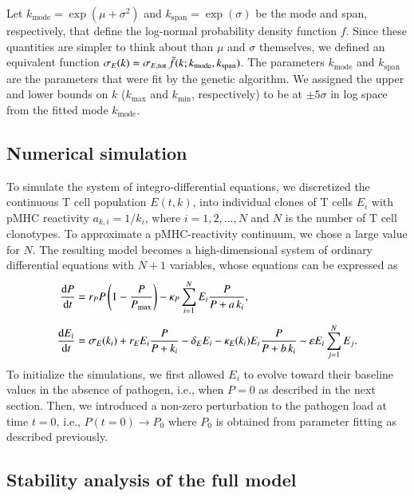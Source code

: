 Let $k_{\textrm{mode}}=\exp(\mu+\sigma^2)$ and $k_{\textrm{span}}=\exp(\sigma)$ be the mode and span, respectively, that define the log-normal probability density function $f$. Since these quantities are simpler to think about than $\mu$ and $\sigma$ themselves, we defined an equivalent function $\sigma_E(k)=\sigma_{E,\textrm{tot}} \, \Tilde{f} (k;k_{\textrm{mode}},k_{\textrm{span}})$. The parameters $k_{\textrm{mode}}$ and $k_{\textrm{span}}$ are the parameters that were fit by the genetic algorithm. We assigned the upper and lower bounds on $k$ ($k_{\textrm{max}}$ and $k_{\textrm{min}}$, respectively) to be at $\pm 5\sigma$ in log space from the fitted mode $k_{\textrm{mode}}$.


\subsection{Numerical simulation}
\label{sec:AvC_numericalSimmulation}

To simulate the system of integro-differential equations, we discretized the continuous T cell population $E(t,k)$, into individual clones of T cells $E_i$ with pMHC reactivity $a_{k,i} = 1/k_i$, where $i=1,2,...,N$ and $N$ is the number of T cell clonotypes. To approximate a pMHC-reactivity continuum, we chose a large value for $N$. The resulting model becomes a high-dimensional system of ordinary differential equations with $N+1$ variables, whose equations can be expressed as
%
\begin{align*}
    \dv{P}{t} &= r_P P \left(1 - \frac{P}{P_{\textrm{max}}}\right) - \kappa_P \sum_{i=1}^N E_i \frac{P}{P+a \, k_i}, \\[0.5em]
    \dv{E_i}{t} &= \sigma_E(k_i) + r_E E_i \frac{P}{P+k_i} - \delta_E E_i - \kappa_E(k_i) E_i \frac{P}{P+b \, k_i} - \varepsilon E_i \sum_{j=1}^N E_j.
\end{align*}
%
To initialize the simulations, we first allowed $E_i$ to evolve toward their baseline values in the absence of pathogen, i.e., when $P=0$ as described in the next section. Then, we introduced a non-zero perturbation to the pathogen load at time $t=0$, i.e., $P(t=0)\rightarrow P_0$ where $P_0$ is obtained from parameter fitting as described previously.


\subsection{Stability analysis of the full model}

